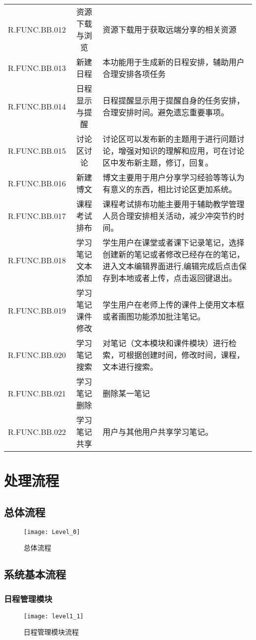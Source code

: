\begin{longtable}{| c | c | p{7cm} |}
R.FUNC.BB.012   &   资源下载与浏览   &   资源下载用于获取远端分享的相关资源   \\
R.FUNC.BB.013   &   新建日程   &   本功能用于生成新的日程安排，辅助用户合理安排各项任务   \\
R.FUNC.BB.014   &   日程显示与提醒   &   日程提醒显示用于提醒自身的任务安排，合理安排时间。避免遗忘重要事项。   \\
R.FUNC.BB.015   &   讨论区讨论   &   讨论区可以发布新的主题用于进行问题讨论，增强对知识的理解和应用，可在讨论区中发布新主题，修订，回复。   \\
R.FUNC.BB.016   &   新建博文   &   博文主要用于用户分享学习经验等等认为有意义的东西，相比讨论区更加系统。   \\
R.FUNC.BB.017   &   课程考试排布   &   课程考试排布功能主要用于辅助教学管理人员合理安排相关活动，减少冲突节约时间。   \\
R.FUNC.BB.018   &   学习笔记文本添加   &    学生用户在课堂或者课下记录笔记，选择创建新的笔记或者修改已经存在的笔记，进入文本编辑界面进行,编辑完成后点击保存到本地或者上传，点击返回键退出。   \\
R.FUNC.BB.019   &   学习笔记课件修改   &   学生用户在老师上传的课件上使用文本框或者画图功能添加批注笔记。   \\
R.FUNC.BB.020   &   学习笔记搜索   &   对笔记（文本模块和课件模块）进行检索，可根据创建时间，修改时间，课程，文本进行搜索。   \\
R.FUNC.BB.021   &   学习笔记删除   &   删除某一笔记   \\
R.FUNC.BB.022   &   学习笔记共享   &   用户与其他用户共享学习笔记。 \\

\end{longtable}


\section{处理流程}
\subsection{总体流程}
\begin{figure}[H]
\centering
\texttt{[image: Level\_0]}
\caption{总体流程}
\end{figure}

\subsection{系统基本流程}
\subsubsection{日程管理模块}
\begin{figure}[H]
\centering
\texttt{[image: level1\_1]}
\caption{日程管理模块流程}
\end{figure}
